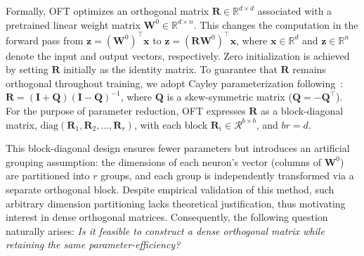 Formally, OFT optimizes an orthogonal matrix $\bm{R}\in\mathbb{R}^{d\times d}$ associated with a pretrained linear weight matrix $\bm{W}^0\in\mathbb{R}^{d\times n}$. This changes the computation in the forward pass from $\bm{z} = (\bm{W}^0)^\top \bm{x}$ to $\bm{z} = (\bm{R}\bm{W}^0)^\top \bm{x}$, where $\bm{x}\in\mathbb{R}^{d}$ and $\bm{z}\in\mathbb{R}^{n}$ denote the input and output vectors, respectively. Zero initialization is achieved by setting $\bm{R}$ initially as the identity matrix. To guarantee that $\bm{R}$ remains orthogonal throughout training, we adopt Cayley parameterization following~\cite{qiu2023controlling,liu2021orthogonal}: $\bm{R} = (\bm{I} + \bm{Q})(\bm{I} - \bm{Q})^{-1}$, where $\bm{Q}$ is a skew-symmetric matrix ($\bm{Q} = -\bm{Q}^\top$). For the purpose of parameter reduction, OFT expresses $\bm{R}$ as a block-diagonal matrix, $\text{diag}(\bm{R}_1, \bm{R}_2, \ldots, \bm{R}_r)$, with each block $\bm{R}_i \in \mathcal{R}^{b\times b}$, and $br = d$. 

This block-diagonal design ensures fewer parameters but introduces an artificial grouping assumption: the dimensions of each neuron's vector (columns of $\bm{W}^0$) are partitioned into $r$ groups, and each group is independently transformed via a separate orthogonal block. Despite empirical validation of this method, such arbitrary dimension partitioning lacks theoretical justification, thus motivating interest in dense orthogonal matrices. Consequently, the following question naturally arises: \emph{Is it feasible to construct a dense orthogonal matrix while retaining the same parameter-efficiency?}

